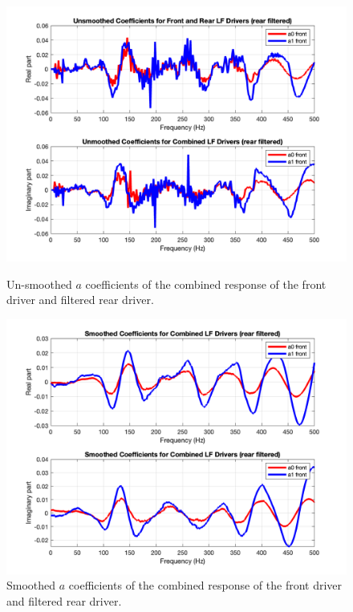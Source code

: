 \documentclass{report}
\begin{document}
        \begin{figure}[H]
            \begin{minipage}{.49\textwidth}
                \includegraphics[width=\linewidth]{figs/filteredaCoeffNoSmooth.png}
                \caption{Un-smoothed $a$ coefficients of the combined response of the front driver and filtered rear driver.}
                \label{filteredaCoeffNoSmooth}
            \end{minipage}
            \begin{minipage}{.49\textwidth}
                \includegraphics[width=\linewidth]{figs/filteredaCoeffsSmoothed.png}
                \caption{Smoothed $a$ coefficients of the combined response of the front driver and filtered rear driver.}
                \label{filteredaCoeffsSmoothed}
            \end{minipage}
        \end{figure}
\end{document}
